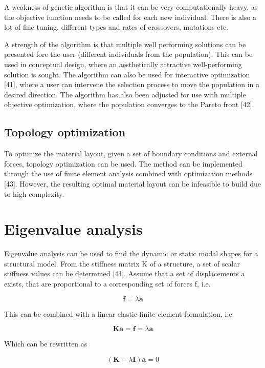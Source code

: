 A weakness of genetic algorithm is that it can be very computationally heavy, as the objective function needs to be called for each new individual. There is also a lot of fine tuning, different types and rates of crossovers, mutations etc. 

A strength of the algorithm is that multiple well performing solutions can be presented fore the user (different individuals from the population). This can be used in conceptual design, where an aesthetically attractive well-performing solution is sought. The algorithm can also be used for interactive optimization [41], where a user can intervene the selection process to move the population in a desired direction. The algorithm has also been adjusted for use with multiple objective optimization, where the population converges to the Pareto front [42].

\subsection{Topology optimization}
To optimize the material layout, given a set of boundary conditions and external forces, topology optimization can be used. The method can be implemented through the use of finite element analysis combined with optimization methods [43]. However, the resulting optimal material layout can be infeasible to build due to high complexity.

\section{Eigenvalue analysis}
Eigenvalue analysis can be used to find the dynamic or static modal shapes for a structural model. From the stiffness matrix K of a structure, a set of scalar stiffness values can be determined [44]. Assume that a set of displacements a exists, that are proportional to a corresponding set of forces f, i.e.

\begin{equation*}
\mathbf{f} = \lambda \mathbf{a}
\end{equation*}

This can be combined with a linear elastic finite element formulation, i.e.

\begin{equation*}
\mathbf{Ka} =\mathbf{f} = \lambda \mathbf{a}
\end{equation*}

Which can be rewritten as

\begin{equation*}
(\mathbf{K} - \lambda \mathbf{I})\mathbf{a} = 0
\end{equation*}

